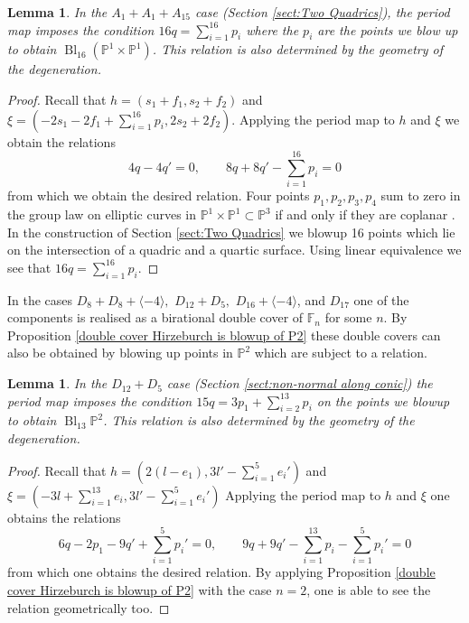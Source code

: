 \documentclass[a4paper]{amsart}
\theoremstyle{definition}
\theoremstyle{plain}
\newtheorem{lemma}[defn]{Lemma}
\theoremstyle{remark}
\newcommand{\PS}{\mathbb{P}}
\newcommand{\F}{\mathbb{F}}
\begin{document}
\begin{lemma}
In the $A_1+A_1+A_{15}$ case (Section \ref{sect:Two Quadrics}), the period map imposes the condition $16q=\sum_{i=1}^{16}p_i$ where the $p_i$ are the points we blow up to obtain $\operatorname{Bl}_{16}(\PS^1\times\PS^1)$. This relation is also determined by the geometry of the degeneration.
\end{lemma}

\begin{proof}
Recall that $h=(s_1+f_1,s_2+f_2)$ and $\xi=(-2s_1-2f_1+\sum_{i=1}^{16}p_i,2s_2+2f_2)$. Applying the period map to $h$ and $\xi$ we obtain the relations
$$4q-4q'=0,\qquad 8q+8q'-\sum_{i=1}^{16}p_i=0$$
from which we obtain the desired relation. Four points $p_1,p_2,p_3,p_4$ sum to zero in the group law on elliptic curves in $\PS^1\times\PS^1 \subset\PS^3$  if and only if they are coplanar \cite{Sil09}. In the construction of Section \ref{sect:Two Quadrics} we blowup 16 points which lie on the intersection of a quadric and a quartic surface. Using linear equivalence we see that $16q=\sum_{i=1}^{16}p_i$.
\end{proof}

In the cases $D_8+D_8+\langle -4 \rangle,$ $D_{12}+D_5,$ $D_{16}+\langle -4 \rangle$, and $D_{17}$ one of the components is realised as a birational double cover of $\F_n$ for some $n$. By Proposition \ref{double cover Hirzeburch is blowup of P2} these double covers can also be obtained by blowing up points in $\PS^2$ which are subject to a relation.

\begin{lemma}
In the $D_{12}+D_5$ case (Section \ref{sect:non-normal along conic}) the period map imposes the condition $15q = 3p_1+\sum_{i=2}^{13}p_i$ on the points we blowup to obtain $\operatorname{Bl}_{13}\PS^2$. This relation is also determined by the geometry of the degeneration.
\end{lemma}

\begin{proof}
Recall that $h = (2(l-e_1), 3l'-\sum_{i=1}^5e_i')$ and $\xi=(-3l+\sum_{i=1}^{13}e_i,3l'-\sum_{i=1}^5e_i')$ Applying the period map to $h$ and $\xi$ one obtains the relations
$$6q-2p_1-9q'+\sum_{i=1}^5p_i'=0, \qquad 9q+9q'-\sum_{i=1}^{13}p_i-\sum_{i=1}^{5}p_i'=0$$
from which one obtains the desired relation. By applying Proposition \ref{double cover Hirzeburch is blowup of P2} with the case $n=2$, one is able to see the relation geometrically too.
\end{proof}
\end{document}
